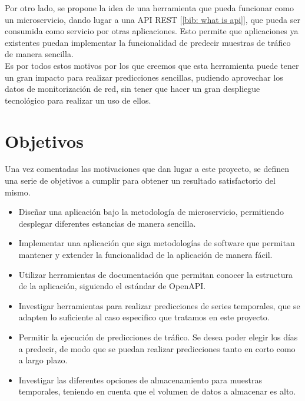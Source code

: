 \documentclass[a4paper, oneside, 12pt]{book}
\begin{document}
	\pagebreak
	
	\noindent Por otro lado, se propone la idea de una herramienta que pueda funcionar como un microservicio, dando lugar a una API REST [\ref{bib: what is api}], que pueda ser consumida como servicio por otras aplicaciones. Esto permite que aplicaciones ya existentes puedan implementar la funcionalidad de predecir muestras de tráfico de manera sencilla. \\
	
	\noindent Es por todos estos motivos por los que creemos que esta herramienta puede tener un gran impacto para realizar predicciones sencillas, pudiendo aprovechar los datos de monitorización de red, sin tener que hacer un gran despliegue tecnológico para realizar un uso de ellos. \\
	
	\section{Objetivos}
	
	\noindent Una vez comentadas las motivaciones que dan lugar a este proyecto, se definen una serie de objetivos a cumplir para obtener un resultado satisfactorio del mismo.
	
	\begin{itemize}
		\item Diseñar una aplicación bajo la metodología de microservicio, permitiendo desplegar diferentes estancias de manera sencilla.
		
		\item Implementar una aplicación que siga metodologías de software que permitan mantener y extender la funcionalidad de la aplicación de manera fácil.
		
		\item Utilizar herramientas de documentación que permitan conocer la estructura de la aplicación, siguiendo el estándar de OpenAPI.
		
		\item Investigar herramientas para realizar predicciones de series temporales, que se adapten lo suficiente al caso especifico que tratamos en este proyecto.
		
		\item Permitir la ejecución de predicciones de tráfico. Se desea poder elegir los días a predecir, de modo que se puedan realizar predicciones tanto en corto como a largo plazo.
		
		\item Investigar las diferentes opciones de almacenamiento para muestras temporales, teniendo en cuenta que el volumen de datos a almacenar es alto. 
	\end{itemize}
	
\end{document}
